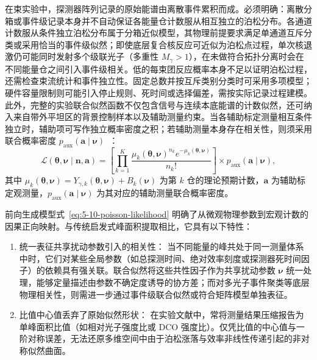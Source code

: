 在束实验中，探测器阵列记录的原始能谱由离散事件累积而成。必须明确：离散分箱或事件级记录本身并不自动保证各能量仓计数服从相互独立的泊松分布。各通道计数服从条件独立泊松分布属于分箱近似模型，其物理前提要求满足单通道互斥分类或采用恰当的事件级似然；即使底层复合核反应可近似为泊松点过程，单次核退激仍可能同时发射多个级联光子（多重性 $M_\gamma > 1$），在未做符合拓扑分离时会在不同能量仓之间引入事件级相关。低的每束团反应概率本身不足以证明泊松过程，还需检查束流统计和事件独立性。固定总数并按互斥类别分类时可采用多项模型；硬件容量限制则可能引入停止规则、死时间或选择偏差，需按实际记录过程建模。此外，完整的实验联合似然函数不仅包含信号与连续本底能谱的计数似然，还可纳入来自带外平坦区的背景控制样本以及辅助测量约束。当各辅助标定测量相互条件独立时，辅助项可写作独立概率密度之积；若辅助测量本身存在相关性，则须采用联合概率密度 $p_{\mathrm{aux}}(\mathbf{a} \mid \boldsymbol{\nu})$~\cite{book-zhu-probability-statistics-in-physics, book-behnke-data-analysis-hep, baker-cousins-1984-histogram-fits}：
\begin{equation}\label{eq:5-10-poisson-likelihood}
\mathcal{L}(\boldsymbol{\theta}, \boldsymbol{\nu} \mid \mathbf{n}, \mathbf{a}) = \left[ \prod_{k=1}^K \frac{\mu_k(\boldsymbol{\theta}, \boldsymbol{\nu})^{n_k} e^{-\mu_k(\boldsymbol{\theta}, \boldsymbol{\nu})}}{n_k!} \right] \times p_{\mathrm{aux}}(\mathbf{a} \mid \boldsymbol{\nu}),
\end{equation}
其中 $\mu_k(\boldsymbol{\theta}, \boldsymbol{\nu}) = Y_{\gamma, k}(\boldsymbol{\theta}, \boldsymbol{\nu}) + B_k(\boldsymbol{\nu})$ 为第 $k$ 仓的理论预期计数，$\mathbf{a}$ 为辅助标定观测量，$p_{\mathrm{aux}}(\mathbf{a} \mid \boldsymbol{\nu})$ 为其对应的辅助测量联合概率密度。

前向生成模型式~\eqref{eq:5-10-poisson-likelihood} 明确了从微观物理参数到宏观计数的因果正向映射。与传统启发式峰面积提取相比，它具有以下特性：
\begin{enumerate}
\item 统一表征共享扰动参数引入的相关性：
当不同能量的峰共处于同一测量体系中时，它们对某些全局参数（如总探测时间、绝对效率刻度或探测器死时间因子）的依赖具有强关联。联合似然将这些共性因子作为共享扰动参数 $\boldsymbol{\nu}$ 统一处理，能够定量描述由参数不确定度诱导的协方差；而对多光子事件聚类等底层物理相关性，则需进一步通过事件级联合似然或符合矩阵模型单独表征。
\item 比值中心值丢弃了原始似然形状：
在实验文献中，常将测量结果压缩报告为单峰面积比值（如相对光子强度比或 DCO 强度比）。仅凭比值的中心值与一阶对称误差，无法还原多维空间中由于泊松涨落与效率非线性传递引起的非对称似然曲面。
\end{enumerate}

